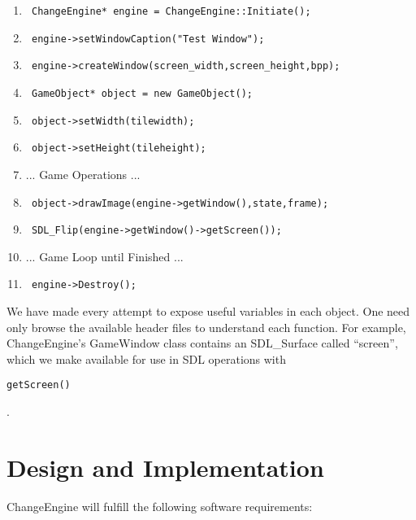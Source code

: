 \documentclass[12pt]{article}
\begin{document}
\begin{enumerate}
 \item \begin{verbatim} ChangeEngine* engine = ChangeEngine::Initiate(); \end{verbatim}
 \item \begin{verbatim} engine->setWindowCaption("Test Window"); \end{verbatim}
 \item \begin{verbatim} engine->createWindow(screen_width,screen_height,bpp); \end{verbatim}
 \item \begin{verbatim} GameObject* object = new GameObject(); \end{verbatim}
 \item \begin{verbatim} object->setWidth(tilewidth); \end{verbatim}
 \item \begin{verbatim} object->setHeight(tileheight); \end{verbatim}
 \item ... Game Operations ...
 \item \begin{verbatim} object->drawImage(engine->getWindow(),state,frame); \end{verbatim}
 \item \begin{verbatim} SDL_Flip(engine->getWindow()->getScreen()); \end{verbatim}
 \item ... Game Loop until Finished ...
 \item \begin{verbatim} engine->Destroy(); \end{verbatim}
\end{enumerate}

We have made every attempt to expose useful variables in each object. One need only browse the available header files to understand each function. For example, ChangeEngine's GameWindow class contains an SDL\_Surface called ``screen'', which we make available for use in SDL operations with \begin{verbatim}getScreen()\end{verbatim}.

  \section{Design and Implementation}
    ChangeEngine will fulfill the following software requirements:
\end{document}
